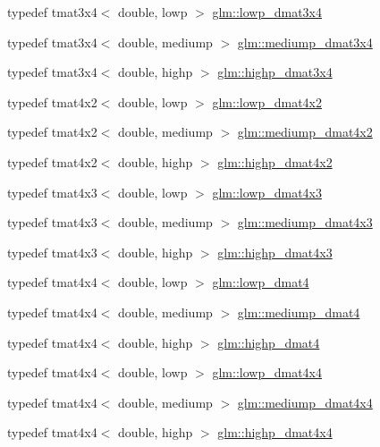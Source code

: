 \begin{DoxyCompactItemize}
\item 
typedef tmat3x4$<$ double, lowp $>$ \hyperlink{group__core__precision_gadbca772b626928af301ea079903ee5d9}{glm\-::lowp\-\_\-dmat3x4}
\item 
typedef tmat3x4$<$ double, mediump $>$ \hyperlink{group__core__precision_ga38bf4080b5b7d9ecc1fdbe2932511e4b}{glm\-::mediump\-\_\-dmat3x4}
\item 
typedef tmat3x4$<$ double, highp $>$ \hyperlink{group__core__precision_ga2f3cf8e3bd4ea0beeefe56b45b14118b}{glm\-::highp\-\_\-dmat3x4}
\item 
typedef tmat4x2$<$ double, lowp $>$ \hyperlink{group__core__precision_gaeee03c38861981ecb29f3f71644bf3ac}{glm\-::lowp\-\_\-dmat4x2}
\item 
typedef tmat4x2$<$ double, mediump $>$ \hyperlink{group__core__precision_gaee918464c0be014e744ff38f37c18585}{glm\-::mediump\-\_\-dmat4x2}
\item 
typedef tmat4x2$<$ double, highp $>$ \hyperlink{group__core__precision_gaa0a2369be2e3d5a4db98cae345413dc1}{glm\-::highp\-\_\-dmat4x2}
\item 
typedef tmat4x3$<$ double, lowp $>$ \hyperlink{group__core__precision_gac445c564f0c68d3520eca97ea755e618}{glm\-::lowp\-\_\-dmat4x3}
\item 
typedef tmat4x3$<$ double, mediump $>$ \hyperlink{group__core__precision_ga9870d3f13ee4601a8abf75f6b54440b9}{glm\-::mediump\-\_\-dmat4x3}
\item 
typedef tmat4x3$<$ double, highp $>$ \hyperlink{group__core__precision_gaec00d802f271a807485a0069cdb5ea05}{glm\-::highp\-\_\-dmat4x3}
\item 
typedef tmat4x4$<$ double, lowp $>$ \hyperlink{group__core__precision_gafb95042ba1765add225ae138437f860e}{glm\-::lowp\-\_\-dmat4}
\item 
typedef tmat4x4$<$ double, mediump $>$ \hyperlink{group__core__precision_ga434a0c62564f19f260ed0520995e90f3}{glm\-::mediump\-\_\-dmat4}
\item 
typedef tmat4x4$<$ double, highp $>$ \hyperlink{group__core__precision_ga457246aa7c671b1ed3dce700b3c1d4c0}{glm\-::highp\-\_\-dmat4}
\item 
typedef tmat4x4$<$ double, lowp $>$ \hyperlink{group__core__precision_gad9168c20a21d1bfeb0f5d2ddfb98f519}{glm\-::lowp\-\_\-dmat4x4}
\item 
typedef tmat4x4$<$ double, mediump $>$ \hyperlink{group__core__precision_ga6dc4057e30931ebd0b5d7e44ef27763a}{glm\-::mediump\-\_\-dmat4x4}
\item 
typedef tmat4x4$<$ double, highp $>$ \hyperlink{group__core__precision_ga46855bd8fdcb8dbc7db5d2aaeb91be69}{glm\-::highp\-\_\-dmat4x4}

\end{DoxyCompactItemize}
